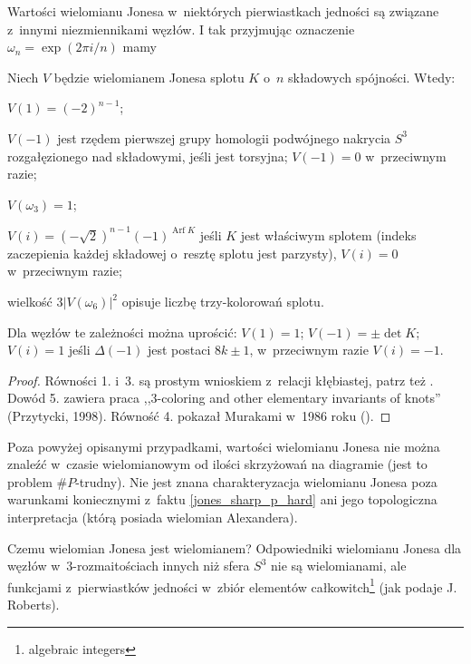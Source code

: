 Wartości wielomianu Jonesa w~niektórych pierwiastkach jedności są związane z~innymi niezmiennikami węzłów.
I tak przyjmując oznaczenie $\omega_n = \exp(2\pi i/n)$ mamy

\begin{proposition} \label{jones_sharp_p_hard}
	Niech $V$ będzie wielomianem Jonesa splotu $K$ o~$n$ składowych spójności.
	Wtedy:
	\begin{compactenum}
		\item $V(1) = (-2)^{n-1}$;
		\item $V(-1)$ jest rzędem pierwszej grupy homologii podwójnego nakrycia $S^3$ rozgałęzionego nad składowymi, jeśli jest torsyjna; $V(-1) = 0$ w~przeciwnym razie;
		\item $V(\omega_3) = 1$;
		\item $V(i) = (-\sqrt 2)^{n-1}(-1)^{\operatorname{Arf} K}$ jeśli $K$ jest właściwym splotem (indeks zaczepienia każdej składowej o~resztę splotu jest parzysty), $V(i) = 0$ w~przeciwnym razie;
		\item wielkość $3|V(\omega_6)|^2$ opisuje liczbę trzy-kolorowań splotu.
	\end{compactenum}
	Dla węzłów te zależności można uprościć: $V(1) = 1$; $V(-1) = \pm \det K$; $V(i) = 1$ jeśli $\Delta(-1)$ jest postaci $8k \pm 1$, w~przeciwnym razie $V(i) = -1$.
\end{proposition}

\begin{proof}
	Równości 1. i~3. są prostym wnioskiem z~relacji kłębiastej, patrz też \cite{jones87}.
	Dowód 5. zawiera praca ,,3-coloring and other elementary invariants of knots'' (Przytycki, 1998).
	Równość 4. pokazał Murakami w~1986 roku (\cite{murakami86}).
\end{proof}

Poza powyżej opisanymi przypadkami, wartości wielomianu Jonesa nie można znaleźć w~czasie wielomianowym od ilości skrzyżowań na diagramie (jest to problem $\#P$-trudny).
Nie jest znana charakteryzacja wielomianu Jonesa poza warunkami koniecznymi z~faktu \ref{jones_sharp_p_hard} ani jego topologiczna interpretacja (którą posiada wielomian Alexandera).

Czemu wielomian Jonesa jest wielomianem?
Odpowiedniki wielomianu Jonesa dla węzłów w~3-rozmaitościach innych niż sfera $S^3$ nie są wielomianami, ale funkcjami z~pierwiastków jedności w~zbiór elementów całkowitch\footnote{algebraic integers} (jak podaje J. Roberts).

